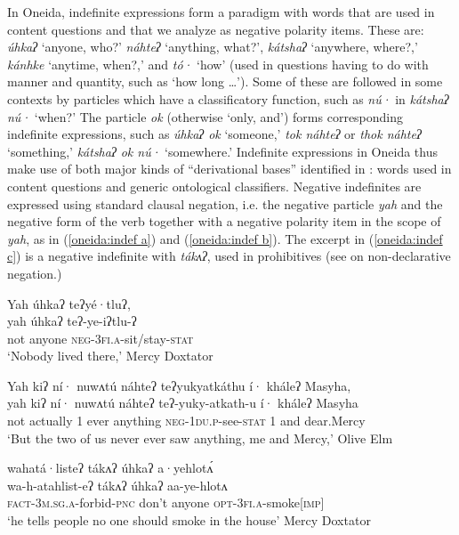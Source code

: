 \documentclass[output=paper,colorlinks,citecolor=brown]{langscibook}
\begin{document}
In Oneida, indefinite expressions form a paradigm with words that are used in content questions and that we analyze as negative polarity items. These are: \textit{úhkaʔ} `anyone, who?' \textit{náhteʔ} `anything, what?', \textit{kátshaʔ} `anywhere, where?,' \textit{kánhke} `anytime, when?,' and \textit{t\'o·} `how' (used in questions having to do with manner and quantity, such as `how long \ldots'). Some of these are followed in some contexts by particles which have a classificatory function, such as \textit{nú·} in \textit{kátshaʔ nú·} `when?' The particle \textit{ok} (otherwise `only, and') forms corresponding indefinite expressions, such as \textit{úhkaʔ ok} `someone,' \textit{tok náhteʔ} or \textit{thok náhteʔ} `something,' \textit{kátshaʔ ok nú·} `somewhere.' Indefinite expressions in Oneida  thus make use of both major kinds of ``derivational bases'' identified in \citet[26]{Haspelmath1997}: words used in content questions and generic ontological classifiers. Negative indefinites are expressed using standard clausal negation, i.e. the negative particle \textit{yah} and the negative form of the verb together with a negative polarity item in the scope of \textit{yah}, as in (\ref{oneida:indef a}) and (\ref{oneida:indef b}). The excerpt in (\ref{oneida:indef c}) is a negative indefinite with \textit{tákʌʔ}, used in prohibitives (see   on non-declarative negation.)

\ea\label{oneida:indef a} 
    \glll Yah úhkaʔ teʔyé·tluʔ,   \\
    yah úhkaʔ teʔ-ye-iʔtlu-ʔ   \\
    not anyone \textsc{neg-3fi.a}-sit/stay-\textsc{stat}  \\
    \glt `Nobody lived there,' Mercy Doxtator \citep[143 (6)]{MichelsonEtAl2016}
\z

\ea\label{oneida:indef b} 
    \glll Yah kiʔ ní· nuwʌtú náhteʔ teʔyukyatkáthu í· kháleʔ Masyha, \\
    yah kiʔ ní· nuwʌtú náhteʔ teʔ-yuky-atkath-u í· kháleʔ Masyha \\
    not {actually} \textsc{1} ever anything \textsc{neg-1du.p}-see-\textsc{stat} \textsc{1} and {dear.Mercy} \\
    \glt `But the two of us never ever saw anything, me and Mercy,' Olive Elm \citep[64 (24)]{MichelsonEtAl2016}
\z

\ea\label{oneida:indef c} 
    {\glll wahatá·listeʔ tákʌʔ úhkaʔ a·yehlotʌ́  \\
    wa-h-atahlist-eʔ tákʌʔ úhkaʔ aa-ye-hlotʌ   \\
    \textsc{fact-3m.sg.a}-forbid-\textsc{pnc} don't anyone \textsc{opt-3fi.a}-smoke[\textsc{imp}]  \\}
    \glt `he tells people no one should smoke in the house' Mercy Doxtator \citep[186 (16)]{MichelsonEtAl2016}
\z
 
\end{document}

